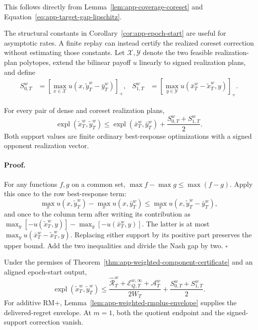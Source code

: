 This follows directly from Lemma~\ref{lem:app-coverage-coreset} and
Equation~\ref{eq:app-target-gap-lipschitz}.

The structural constants in Corollary~\ref{cor:app-epoch-start} are useful
for asymptotic rates.  A finite replay can instead certify the realized
coreset correction without estimating those constants.  Let
$\mathcal X,\mathcal Y$ denote the two feasible realization-plan polytopes,
extend the bilinear payoff $u$ linearly to signed realization plans, and define
\begin{align}
S_{0,T}^w
&=\left[\max_{x\in\mathcal X}
u(x,\widetilde y_T^w-\bar y_T^w)\right]_+,
&
S_{1,T}^w
&=\left[\max_{y\in\mathcal Y}
u(\bar x_T^w-\widetilde x_T^w,y)\right]_+ .
\label{eq:app-signed-coreset-supports}
\end{align}

\begin{lemma}
\label{lem:app-signed-coreset-transfer}
For every pair of dense and coreset realization plans,
\begin{equation}
\operatorname{expl}(\widetilde x_T^w,\widetilde y_T^w)
\le
\operatorname{expl}(\bar x_T^w,\bar y_T^w)
+\frac{S_{0,T}^w+S_{1,T}^w}{2}.
\label{eq:app-signed-coreset-transfer}
\end{equation}
Both support values are finite ordinary best-response optimizations with a
signed opponent realization vector.
\end{lemma}

\paragraph{Proof.}
For any functions $f,g$ on a common set,
$\max f-\max g\le\max(f-g)$.  Apply this once to the row best-response term:
\[
\max_xu(x,\widetilde y_T^w)-\max_xu(x,\bar y_T^w)
\le\max_xu(x,\widetilde y_T^w-\bar y_T^w),
\]
and once to the column term after writing its contribution as
$\max_y[-u(\widetilde x_T^w,y)]-\max_y[-u(\bar x_T^w,y)]$.
The latter is at most
$\max_yu(\bar x_T^w-\widetilde x_T^w,y)$.  Replacing either support by its
positive part preserves the upper bound.  Add the two inequalities and
divide the Nash gap by two. \hfill$\square$

\begin{corollary}
\label{cor:app-complete-weighted-output-certificate}
Under the premises of
Theorem~\ref{thm:app-weighted-component-certificate} and an aligned
epoch-start output,
\begin{equation}
\operatorname{expl}(\widetilde x_T^w,\widetilde y_T^w)
\le
\frac{\widehat{\mathcal R}_T^w
+\mathcal E_{Q,T}^{w,\infty}+\mathcal A_T^w}{2W_T}
+\frac{S_{0,T}^w+S_{1,T}^w}{2}.
\label{eq:app-complete-weighted-output-certificate}
\end{equation}
For additive RM+, Lemma~\ref{lem:app-weighted-rmplus-envelope} supplies the
delivered-regret envelope.  At $m=1$, both the quotient endpoint and the
signed-support correction vanish.
\end{corollary}

